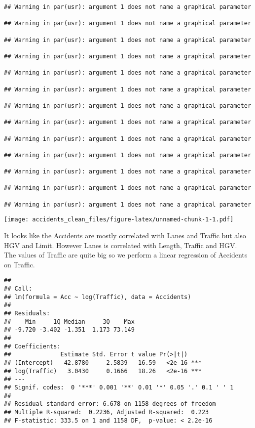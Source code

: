 \documentclass[
]{article}
\begin{document}
\begin{verbatim}
## Warning in par(usr): argument 1 does not name a graphical parameter

## Warning in par(usr): argument 1 does not name a graphical parameter

## Warning in par(usr): argument 1 does not name a graphical parameter

## Warning in par(usr): argument 1 does not name a graphical parameter

## Warning in par(usr): argument 1 does not name a graphical parameter

## Warning in par(usr): argument 1 does not name a graphical parameter

## Warning in par(usr): argument 1 does not name a graphical parameter

## Warning in par(usr): argument 1 does not name a graphical parameter

## Warning in par(usr): argument 1 does not name a graphical parameter

## Warning in par(usr): argument 1 does not name a graphical parameter

## Warning in par(usr): argument 1 does not name a graphical parameter

## Warning in par(usr): argument 1 does not name a graphical parameter

## Warning in par(usr): argument 1 does not name a graphical parameter
\end{verbatim}

\texttt{[image: accidents\_clean\_files/figure-latex/unnamed-chunk-1-1.pdf]}

It looks like the Accidents are mostly correlated with Lanes and Traffic
but also HGV and Limit. However Lanes is correlated with Length, Traffic
and HGV.\\
The values of Traffic are quite big so we perform a linear regression of
Accidents on Traffic.

\begin{verbatim}
## 
## Call:
## lm(formula = Acc ~ log(Traffic), data = Accidents)
## 
## Residuals:
##    Min     1Q Median     3Q    Max 
## -9.720 -3.402 -1.351  1.173 73.149 
## 
## Coefficients:
##              Estimate Std. Error t value Pr(>|t|)    
## (Intercept)  -42.8780     2.5839  -16.59   <2e-16 ***
## log(Traffic)   3.0430     0.1666   18.26   <2e-16 ***
## ---
## Signif. codes:  0 '***' 0.001 '**' 0.01 '*' 0.05 '.' 0.1 ' ' 1
## 
## Residual standard error: 6.678 on 1158 degrees of freedom
## Multiple R-squared:  0.2236, Adjusted R-squared:  0.223 
## F-statistic: 333.5 on 1 and 1158 DF,  p-value: < 2.2e-16
\end{verbatim}
\end{document}
